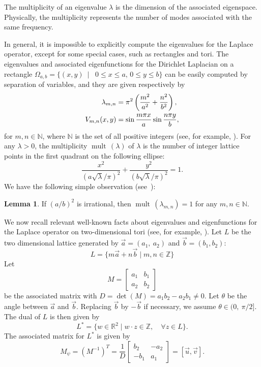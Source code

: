 \documentclass[11pt]{amsart}
\theoremstyle{definition}
\newtheorem{lemma}[theorem]{Lemma}
\def\N{{\mathbb N}}
\def\mult{\operatorname{mult}\,}
\begin{document}
The multiplicity of an eigenvalue $\lambda$ is the dimension of the associated eigenspace. Physically, the multiplicity represents the number of modes associated with the same frequency.  

In general, it is impossible to explicitly compute the eigenvalues for the Laplace operator, except for some special cases,
such as rectangles and tori.  The eigenvalues and associated eigenfunctions for the Dirichlet Laplacian on
a rectangle	$\Omega_{a, b} = \{(x,y) \ \mid \ \text{ 0}\leq x \leq a\text{, 0}\leq y \leq b\}$ can be easily computed by separation of variables, and they are given respectively by		
\[
		\begin{aligned}	
			\lambda_{m,n} 
			&=\pi ^2\left(\frac{m^2}{a^2}+
			\frac{n^2}{b^2}\right), \\
			V_{m,n}\text(x,y) &= \sin \frac{m\pi x}{a}\sin \frac{n\pi y}{b}, 
		\end{aligned} 
		\]
for $m,n \in \N$, where $\N$ is the set of all positive integers (see, for example, \cite[Lemma~6.2.1]{Davies95}). 
For any $\lambda >0$, the multiplicity $\mult(\lambda)$ of  $\lambda$ is the number of integer lattice points in the first quadrant on the following ellipse: 
		\begin{equation}\label{eq:mult-r}
		\frac{x^2}{(a\sqrt{\lambda}/\pi)^2} +\frac{y^2}{(b\sqrt{\lambda}/\pi)^2}=1.
		\end{equation}
We have the following simple observation (see~\cite{Fu2025-ph}):

\begin{lemma}\label{lm:1} 
If $(a/b)^2$ is irrational, then $\mult(\lambda_{m, n})=1$ for any  $m, n\in\N$. 
\end{lemma}

We now recall relevant well-known facts about eigenvalues and eigenfunctions for the Laplace operator on two-dimensional tori (see, for example, \cite{Milnor64}).  Let $L$ be the two dimensional lattice generated by  $\vec{a}=(a_1, \ a_2)$ and $\vec{b}=(b_1, b_2)$:
\begin{equation}\label{eq:L}
L = \{ m \vec{a} + n \vec{b} \mid m, n \in \mathbb{Z} \}
\end{equation}
Let
\[
M = 
\begin{bmatrix}
	a_1 & b_1 \\
	a_2 & b_2
\end{bmatrix}
\]
be the associated matrix with $D = \det(M) = a_1 b_2 - a_2 b_1 \neq 0$.  Let $\theta$ be the angle between $\vec{a}$ and $\vec{b}$. Replacing $\vec{b}$ by $-\vec{b}$ if necessary, we assume $\theta\in (0, \ \pi/2]$. The dual of \( L \) is then given by
\[
L^* = \{ w\in \mathbb{R}^2 \mid w \cdot z\in \mathbb{Z} ,  \quad \forall z \in L \}.
\]
The associated matrix for \( L^* \) is given by
\[
M_{\psi} = (M^{-1})^T = \frac{1}{D} \begin{bmatrix}
	b_2 & -a_2 \\
	-b_1 & a_1
\end{bmatrix} = [\vec{u}, \vec{v}].
\]
\end{document}
